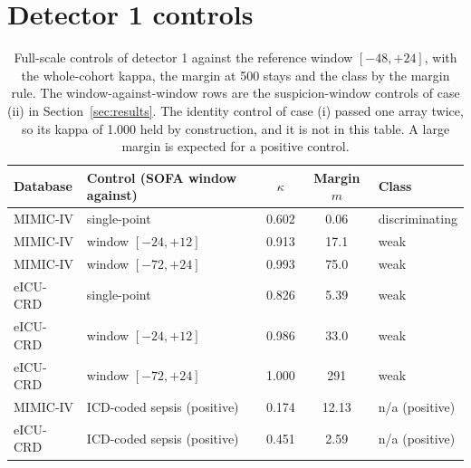 \documentclass[10pt]{article}
\theoremstyle{definition}
\begin{document}
\section{Detector 1 controls}
\label{apd:controls}
\begin{table}[h]
\centering\footnotesize
\begin{tabular}{@{}llccl@{}}
\toprule
Database & Control (SOFA window against) & $\kappa$ & Margin $m$ & Class\\
\midrule
MIMIC-IV & single-point & 0.602 & 0.06 & discriminating\\
MIMIC-IV & window $[-24,+12]$ & 0.913 & 17.1 & weak\\
MIMIC-IV & window $[-72,+24]$ & 0.993 & 75.0 & weak\\
eICU-CRD & single-point & 0.826 & 5.39 & weak\\
eICU-CRD & window $[-24,+12]$ & 0.986 & 33.0 & weak\\
eICU-CRD & window $[-72,+24]$ & 1.000 & 291 & weak\\
\midrule
MIMIC-IV & ICD-coded sepsis (positive) & 0.174 & 12.13 & n/a (positive)\\
eICU-CRD & ICD-coded sepsis (positive) & 0.451 & 2.59 & n/a (positive)\\
\bottomrule
\end{tabular}
\caption{Full-scale controls of detector 1 against the reference window $[-48,+24]$, with the whole-cohort kappa, the margin at 500 stays and the class by the margin rule. The window-against-window rows are the suspicion-window controls of case (ii) in Section~\ref{sec:results}. The identity control of case (i) passed one array twice, so its kappa of 1.000 held by construction, and it is not in this table. A large margin is expected for a positive control.}
\label{tab:controls}
\end{table}
\end{document}
